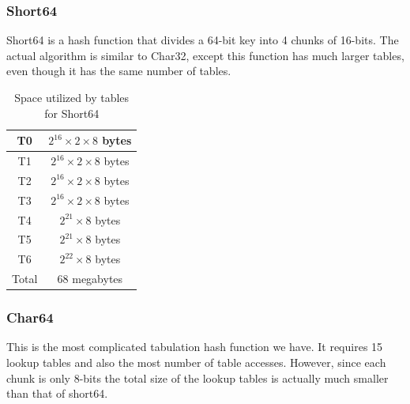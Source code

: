 \documentclass[11pt]{article}
\begin{document}
\subsubsection{Short64}
Short64 is a hash function that divides a 64-bit key into 4 chunks of 16-bits.
The actual algorithm is similar to Char32, except this function has much 
larger tables, even though it has the same number of tables.

\begin{table}
\centering 
\begin{tabular}{|c|c|}
  \hline
T0 & $2^{16}\times 2 \times8$ bytes\\  \hline
T1 & $2^{16}\times 2 \times8$ bytes\\ \hline
T2 & $2^{16}\times 2 \times8$ bytes\\  \hline
T3 & $2^{16}\times 2 \times8$ bytes\\ \hline
T4 & $2^{21}\times8$ bytes\\  \hline
T5 & $2^{21}\times8$ bytes\\ \hline
T6 & $2^{22}\times8$ bytes\\
  \hline \hline
  Total & 68 megabytes \\
  \hline
\end{tabular}
\caption{Space utilized by tables for Short64}
\label{tab:short64mem}
\end{table}

\subsubsection{Char64}
This is the most complicated tabulation hash function we have.
It requires 15 lookup tables and also the most number of table
accesses. However, since each chunk is only 8-bits the total
size of the lookup tables is actually much smaller than that of short64.
\end{document}
